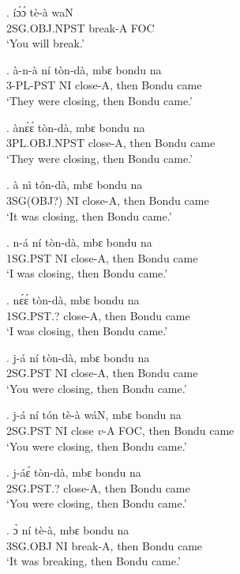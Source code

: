 \documentclass{assets/fieldnotes}
\begin{document}

\exg.
íɔ́ɔ́            tè-à      waN \\
2SG.OBJ.NPST   break-A   FOC \\%
`You will break.'

\exg.
à-n-à       ní   tòn-dà,    mbɛ    bondu   na   \\
3-PL-PST   NI   close-A,   then   Bondu   came \\%
`They were closing, then Bondu came.'

\exg.
ànɛ̀ɛ́           tòn-dà,    mbɛ    bondu   na   \\
3PL.OBJ.NPST   close-A,   then   Bondu   came \\%
`They were closing, then Bondu came.'


\exg.
à           nì   tón-dà,    mbɛ    bondu   na   \\
3SG(OBJ?)   NI   close-A,   then   Bondu   came \\%
`It was closing, then Bondu came.'

\exg.
n-á        ní   tòn-dà,    mbɛ    bondu   na   \\
1SG.PST   NI   close-A,   then   Bondu   came \\%
`I was closing, then Bondu came.'

\exg.
nɛ́ɛ́            tòn-dà,    mbɛ    bondu   na   \\
1SG.PST.?  close-A,   then   Bondu   came \\%
`I was closing, then Bondu came.'

\exg.
j-á        ní   tòn-dà,    mbɛ    bondu   na   \\
2SG.PST   NI   close-A,   then   Bondu   came \\%
`You were closing, then Bondu came.'

\exg.
j-á        ní   tón     tè-à    wáN,   mbɛ    bondu   na   \\
2SG.PST   NI   close   $v$-A   FOC,   then   Bondu   came \\%
`You were closing, then Bondu came.'

\exg.
j-áɛ́            tòn-dà,    mbɛ    bondu   na   \\
2SG.PST.?   close-A,   then   Bondu   came \\%
`You were closing, then Bondu came.'

\exg.
ɔ̀         ní   tè-à,      mbɛ    bondu   na   \\
3SG.OBJ   NI   break-A,   then   Bondu   came \\%
`It was breaking, then Bondu came.'
\end{document}
